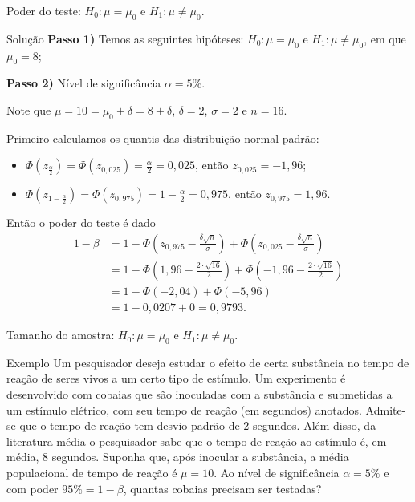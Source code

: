 \documentclass[8pt]{beamer}
\begin{document}
\begin{frame}{Poder do teste: $H_0:\mu = \mu_0$ e $H_1: \mu \neq \mu_0$.}

\begin{block}{Solução}
	\textbf{Passo 1)} Temos as seguintes hipóteses: $H_0: \mu = \mu_0$ e $H_1: \mu \neq \mu_0$, em que $\mu_0=8$;
	\vfill
	
	\textbf{Passo 2)} Nível de significância $\alpha=5\%$.
	\vfill
	
	Note que  $\mu = 10 = \mu_0 + \delta = 8 + \delta$, $\delta = 2$, $\sigma = 2$ e $n = 16$.
	
	Primeiro calculamos os quantis das distribuição normal padrão:
	\begin{itemize}
		\item $\Phi\left( z_\frac{\alpha}{2} \right) = \Phi\left( z_{0,025} \right) = \frac{\alpha}{2} = 0,025$, então $z_{0,025} = -1,96$;
		\item $\Phi\left( z_{1-\frac{\alpha}{2}} \right) = \Phi\left( z_{0,975} \right) =1- \frac{\alpha}{2} = 0,975$, então $z_{0,975} = 1,96$.
	\end{itemize}

	Então o poder do teste é dado
	\begin{align*}
		1-\beta &= 1-  \Phi\left( z_{0,975} - \frac{\delta \sqrt{n}}{\sigma} \right) + \Phi\left( z_{0,025} - \frac{\delta \sqrt{n}}{\sigma} \right)\\
		&= 1 -  \Phi\left( 1,96 - \frac{2 \cdot \sqrt{16}}{2} \right) + \Phi\left( -1,96 - \frac{2 \cdot \sqrt{16}}{2} \right) \\
		&=1 - \Phi\left( -2,04 \right) + \Phi\left( -5,96 \right)\\
		&=1- 0,0207 + 0 =0,9793.
	\end{align*}
\end{block}

\end{frame}

\begin{frame}{Tamanho do amostra: $H_0:\mu = \mu_0$ e $H_1: \mu \neq \mu_0$.}

\large

\begin{block}{Exemplo}
	Um pesquisador deseja estudar o efeito de certa substância no tempo de reação de seres vivos a um certo tipo de estímulo. 
		Um experimento é desenvolvido com cobaias que são inoculadas com a substância e submetidas a um estímulo elétrico, com seu tempo de reação (em segundos) anotados.  Admite-se que o tempo de reação tem desvio padrão de 2 segundos. Além disso, da literatura média o pesquisador sabe que o tempo de reação ao estímulo é, em média, 8 segundos. Suponha que, após inocular a substância, a média  populacional de tempo de reação é $\mu = 10$. Ao nível de significância $\alpha=5\%$ e com poder $95\%=1-\beta$, quantas cobaias precisam ser testadas?
\end{block}

\normalsize

\end{frame}
\end{document}
